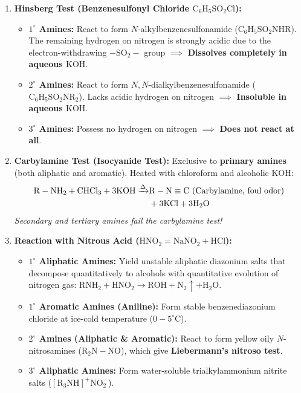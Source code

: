 \documentclass[10pt,a4paper]{article}
\begin{document}
\begin{usecasebox}
\begin{enumerate}[leftmargin=*]
  \item \textbf{Hinsberg Test (Benzenesulfonyl Chloride $\mathrm{C_6H_5SO_2Cl}$):}
  \begin{itemize}
    \item \textbf{$1^\circ$ Amines:} React to form $N$-alkylbenzenesulfonamide ($\mathrm{C_6H_5SO_2NHR}$). The remaining hydrogen on nitrogen is strongly acidic due to the electron-withdrawing $-\mathrm{SO_2}-$ group $\implies$ \textbf{Dissolves completely in aqueous $\mathrm{KOH}$}.
    \item \textbf{$2^\circ$ Amines:} React to form $N,N$-dialkylbenzenesulfonamide ($\mathrm{C_6H_5SO_2NR_2}$). Lacks acidic hydrogen on nitrogen $\implies$ \textbf{Insoluble in aqueous $\mathrm{KOH}$}.
    \item \textbf{$3^\circ$ Amines:} Possess no hydrogen on nitrogen $\implies$ \textbf{Does not react at all}.
  \end{itemize}
  \item \textbf{Carbylamine Test (Isocyanide Test):}
  Exclusive to \textbf{primary amines} (both aliphatic and aromatic). Heated with chloroform and alcoholic $\mathrm{KOH}$:
  \begin{align}
    \mathrm{R-NH_2} + \mathrm{CHCl_3} + 3\mathrm{KOH} \xrightarrow{\Delta} &\mathbf{\mathrm{R-N\equiv C}} \ (\text{Carbylamine, foul odor}) \notag \\
    &+ 3\mathrm{KCl} + 3\mathrm{H_2O}
  \end{align}
  \textit{Secondary and tertiary amines fail the carbylamine test!}
  \item \textbf{Reaction with Nitrous Acid ($\mathrm{HNO_2} = \mathrm{NaNO_2 + HCl}$):}
  \begin{itemize}
    \item \textbf{$1^\circ$ Aliphatic Amines:} Yield unstable aliphatic diazonium salts that decompose quantitatively to alcohols with quantitative evolution of nitrogen gas: $\mathrm{RNH_2} + \mathrm{HNO_2} \to \mathrm{ROH} + \mathbf{\mathrm{N_2}}\uparrow + \mathrm{H_2O}$.
    \item \textbf{$1^\circ$ Aromatic Amines (Aniline):} Form stable benzenediazonium chloride at ice-cold temperature ($0-5^\circ\text{C}$).
    \item \textbf{$2^\circ$ Amines (Aliphatic \& Aromatic):} React to form yellow oily $N$-nitrosamines ($\mathrm{R_2N-NO}$), which give \textbf{Liebermann's nitroso test}.
    \item \textbf{$3^\circ$ Aliphatic Amines:} Form water-soluble trialkylammonium nitrite salts ($\mathrm{[R_3NH]^+NO_2^-}$).
  \end{itemize}
\end{enumerate}
\end{usecasebox}
\end{document}
